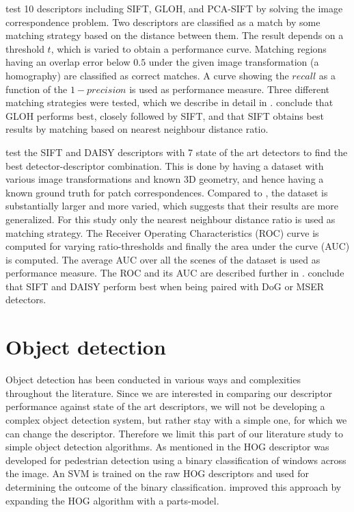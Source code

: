 \documentclass[thesis.tex]{subfiles}
\begin{document}
\citet{mikolajczyk2005performance} test 10 descriptors including SIFT, GLOH, and PCA-SIFT by solving the image correspondence problem. Two descriptors are classified as a match by some matching strategy based on the distance between them. The result depends on a threshold $t$, which is varied to obtain a performance curve. Matching regions having an overlap error below $0.5$ under the given image transformation (a homography) are classified as correct matches. A curve showing the $recall$ as a function of the $1-precision$ is used as performance measure. Three different matching strategies were tested, which we describe in detail in . \citet{mikolajczyk2005performance} conclude that GLOH performs best, closely followed by SIFT, and that SIFT obtains best results by matching based on nearest neighbour distance ratio.

\citet{dahl2011finding} test the SIFT and DAISY descriptors with 7 state of the art detectors to find the best detector-descriptor combination. This is done by having a dataset with various image transformations and known 3D geometry, and hence having a known ground truth for patch correspondences. Compared to \citet{mikolajczyk2005performance}, the dataset is substantially larger and more varied, which suggests that their results are more generalized. For this study only the nearest neighbour distance ratio is used as matching strategy. The Receiver Operating Characteristics (ROC) curve is computed for varying ratio-thresholds and finally the area under the curve (AUC) is computed. The average AUC over all the scenes of the dataset is used as performance measure. The ROC and its AUC are described further in . \citet{dahl2011finding} conclude that SIFT and DAISY perform best when being paired with DoG or MSER detectors.
%
\section{Object detection}
%
Object detection has been conducted in various ways and complexities throughout the literature. Since we are interested in comparing our descriptor performance against state of the art descriptors, we will not be developing a complex object detection system, but rather stay with a simple one, for which we can change the descriptor. Therefore we limit this part of our literature study to simple object detection algorithms. As mentioned in  the HOG descriptor \cite{dalal2005histograms} was developed for pedestrian detection using a binary classification of windows across the image. An SVM is trained on the raw HOG descriptors and used for determining the outcome of the binary classification. \citet{felzenszwalb2008discriminatively} improved this approach by expanding the HOG algorithm with a parts-model.
\end{document}
